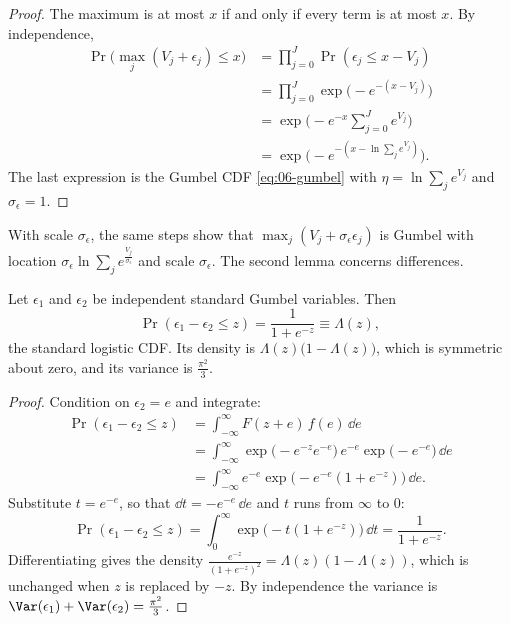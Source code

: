 \begin{proof}
The maximum is at most $x$ if and only if every term is at most $x$. By independence,
\begin{align*}
\Pr\Big(\max_j (V_j + \epsilon_j) \le x\Big) &= \prod_{j=0}^J \Pr(\epsilon_j \le x - V_j) \\
&= \prod_{j=0}^J \exp\big(-e^{-(x - V_j)}\big) \\
&= \exp\Big(-e^{-x}\sum_{j=0}^J e^{V_j}\Big) \\
&= \exp\Big(-e^{-\left(x - \ln\sum_j e^{V_j}\right)}\Big).
\end{align*}
The last expression is the Gumbel CDF \eqref{eq:06-gumbel} with $\eta = \ln\sum_j e^{V_j}$ and
$\sigma_\epsilon = 1$.
\end{proof}

With scale $\sigma_\epsilon$, the same steps show that $\max_j(V_j + \sigma_\epsilon\epsilon_j)$ is Gumbel with
location $\sigma_\epsilon\ln\sum_j e^{\frac{V_j}{\sigma_\epsilon}}$ and scale $\sigma_\epsilon$. The second lemma
concerns differences.

\begin{lemma}\label{lem:06-logistic}
Let $\epsilon_1$ and $\epsilon_2$ be independent standard Gumbel variables. Then
\begin{equation*}
\Pr(\epsilon_1 - \epsilon_2 \le z) = \frac{1}{1 + e^{-z}} \equiv \Lambda(z),
\end{equation*}
the standard logistic CDF. Its density is $\Lambda(z)\big(1 - \Lambda(z)\big)$, which is symmetric about zero,
and its variance is $\frac{\pi^2}{3}$.
\end{lemma}

\begin{proof}
Condition on $\epsilon_2 = e$ and integrate:
\begin{align*}
\Pr(\epsilon_1 - \epsilon_2 \le z)
&= \int_{-\infty}^{\infty} F(z + e)\,f(e)\,\dd e \\
&= \int_{-\infty}^{\infty} \exp\big(-e^{-z}e^{-e}\big)\,e^{-e}\exp\big(-e^{-e}\big)\,\dd e \\
&= \int_{-\infty}^{\infty} e^{-e}\exp\big(-e^{-e}(1 + e^{-z})\big)\,\dd e .
\end{align*}
Substitute $t = e^{-e}$, so that $\dd t = -e^{-e}\,\dd e$ and $t$ runs from $\infty$ to $0$:
\begin{equation*}
\Pr(\epsilon_1 - \epsilon_2 \le z) = \int_0^\infty \exp\big(-t(1 + e^{-z})\big)\,\dd t = \frac{1}{1 + e^{-z}} .
\end{equation*}
Differentiating gives the density $\frac{e^{-z}}{(1 + e^{-z})^2} = \Lambda(z)(1 - \Lambda(z))$, which is unchanged
when $z$ is replaced by $-z$. By independence the variance is $\Var(\epsilon_1) + \Var(\epsilon_2) = \frac{\pi^2}{3}$.
\end{proof}

